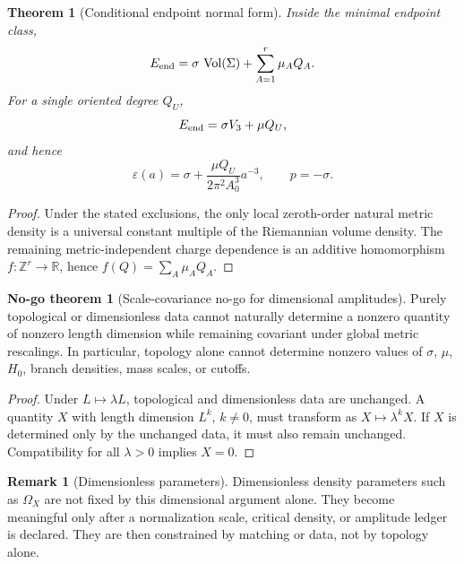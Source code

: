 \documentclass[aps,prd,preprint,onecolumn,nofootinbib,superscriptaddress,showkeys]{revtex4-2}
\numberwithin{equation}{section}
\theoremstyle{definition}
\newtheorem{remark}{Remark}[section]
\newtheorem{nogotheorem}{No-go theorem}[section]
\theoremstyle{plain}
\newtheorem{theorem}{Theorem}[section]
\newcommand{\R}{\mathbb R}
\newcommand{\vol}{\operatorname{Vol}}
\begin{document}
\begin{theorem}[Conditional endpoint normal form]
Inside the minimal endpoint class,
\begin{equation}
E_{\rm end}
=
\sigma\,\vol(\Sigma)
+
\sum_{A=1}^r\mu_AQ_A.
\end{equation}
For a single oriented degree \(Q_U\),
\begin{equation}
E_{\rm end}=\sigma V_3+\mu Q_U,
\end{equation}
and hence
\begin{equation}
\varepsilon(a)=\sigma+\frac{\mu Q_U}{2\pi^2A_0^3}a^{-3},
\qquad
p=-\sigma.
\end{equation}
\end{theorem}

\begin{proof}
Under the stated exclusions, the only local zeroth-order natural metric density is a universal constant multiple of the Riemannian volume density.  The remaining metric-independent charge dependence is an additive homomorphism \(f:\mathbb Z^r\to\R\), hence \(f(Q)=\sum_A\mu_AQ_A\).
\end{proof}

\begin{nogotheorem}[Scale-covariance no-go for dimensional amplitudes]
Purely topological or dimensionless data cannot naturally determine a nonzero quantity of nonzero length dimension while remaining covariant under global metric rescalings.  In particular, topology alone cannot determine nonzero values of \(\sigma\), \(\mu\), \(H_0\), branch densities, mass scales, or cutoffs.
\end{nogotheorem}

\begin{proof}
Under \(L\mapsto\lambda L\), topological and dimensionless data are unchanged.  A quantity \(X\) with length dimension \(L^k\), \(k\ne0\), must transform as \(X\mapsto\lambda^kX\).  If \(X\) is determined only by the unchanged data, it must also remain unchanged.  Compatibility for all \(\lambda>0\) implies \(X=0\).
\end{proof}

\begin{remark}[Dimensionless parameters]
Dimensionless density parameters such as \(\Omega_X\) are not fixed by this dimensional argument alone.  They become meaningful only after a normalization scale, critical density, or amplitude ledger is declared.  They are then constrained by matching or data, not by topology alone.
\end{remark}
\end{document}
